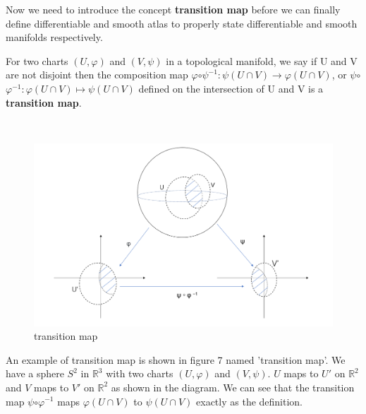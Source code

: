 \documentclass[12pt,twoside]{article}
\begin{document}
Now we need to introduce the concept {\bf transition map} before we can finally define differentiable and smooth atlas to properly state differentiable and smooth manifolds respectively.
\\
\begin{definition}
For two charts $(U,\varphi)$ and $(V,\psi)$ in a topological manifold, we say if U and V are not disjoint then the composition map $\varphi$$\circ$$\psi ^ {-1}:\psi(U\cap V)\rightarrow \varphi(U\cap V)$, or $\psi$$\circ$$\varphi ^ {-1}:\varphi(U\cap V)\mapsto \psi(U\cap V)$ defined on the intersection of U and V is a \textbf{transition map}.
\end{definition}
\\
\begin{figure}[tb]
\centering
\includegraphics[width=160mm]{transition map.png} 
\caption{transition map}
\end{figure}
An example of transition map is shown in figure 7 named 'transition map'. We have a sphere $S^2$ in $\mathbb{R}^3$ with two charts $(U,\varphi)$ and $(V,\psi)$. $U$ maps to $U'$ on $\mathbb{R}^2$ and $V$ maps to $V'$ on $\mathbb{R}^2$ as shown in the diagram. We can see that the transition map $\psi$$\circ$$\varphi ^ {-1}$ maps $\varphi(U\cap V)$ to $\psi(U\cap V)$ exactly as the definition.
\end{document}
